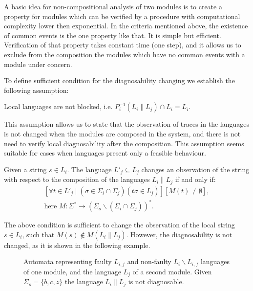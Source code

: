 \documentclass[a4paper, 10pt, conference]{ieeeconf} \IEEEoverridecommandlockouts
\begin{document}
A basic idea for non-compositional analysis of two modules is to create a
property for modules which can be verified by a procedure with computational
complexity lower then exponential. In the criteria mentioned above, the
existence of common events is the one property like that. It is simple but
efficient. Verification of that property takes constant time (one step), and it
allows us to exclude from the composition the modules which have no
common events with a module under concern.

To define sufficient condition for the diagnosability changing we establish the
following assumption:

\begin{assumption}
Local languages are not blocked, i.e. 
$P^{-1}_i(L_i \parallel L_j)\cap L_i = L_i$.
\end{assumption}

This assumption allows us to state that the observation of traces in the
languages is not changed when the modules are composed in the system, and there
is not need to verify local diagnosability after the composition.
This assumption seems suitable for cases when languages present only a feasible
behaviour.

\begin{conjecture}
\label{cnj_changed_observation}
Given a string $ s \in L_i$. The language $L'_j \subseteq L_j$ changes an observation
of the string with respect to the composition of the languages $L_i \parallel L_j$
if and only if:
$$
\begin{array}{l}
	[
		\forall t \in L'_j \mid (\sigma \in \Sigma_i \cap \Sigma_j)
		(t\sigma \in L_j)
	]
	[M(t) \neq \emptyset],
	\\[1ex]
	\textrm{here } M: \Sigma^* \rightarrow 
	(\Sigma_o \backslash (\Sigma_i \cap	\Sigma_j))^*.
\end{array}
$$
\end{conjecture}

The above condition is sufficient to change the observation of the local string
$s \in L_i$, such that $M(s) \not \in M(L_i \parallel L_j)$. However, the
diagnosability is not changed, as it is shown in the following example.

\begin{figure}[t]
\centering

\caption{Automata representing faulty $L_{i,f}$ and
non-faulty $L_i \backslash L_{i,f}$ languages of one module, and the language
$L_j$ of a second module. Given $\Sigma_o = \{b, c, z\}$ the language $L_i
\parallel L_j$ is not diagnosable.}
\label{fig_changed_observation}
\end{figure}
\end{document}
